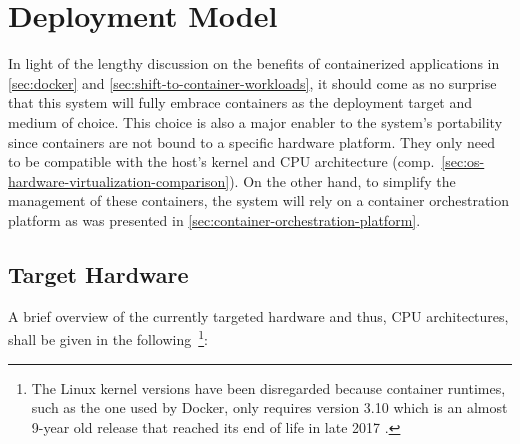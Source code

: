 \section{Deployment Model}
\label{sec:deployment-model}

In light of the lengthy discussion on the benefits of containerized applications in \autoref{sec:docker} and \autoref{sec:shift-to-container-workloads}, it should come as no surprise that this system will fully embrace containers as the deployment target and medium of choice. This choice is also a major enabler to the system's portability since containers are not bound to a specific hardware platform. They only need to be compatible with the host's kernel and \acs{CPU} architecture (comp.~\autoref{sec:os-hardware-virtualization-comparison}). On the other hand, to simplify the management of these containers, the system will rely on a container orchestration platform as was presented in \autoref{sec:container-orchestration-platform}.

\newpage

\subsection{Target Hardware}
\label{sec:deployment-target-hardware}

A brief overview of the currently targeted hardware and thus, \acs{CPU} architectures, shall be given in the following~\footnote{The Linux kernel versions have been disregarded because container runtimes, such as the one used by Docker, only requires version 3.10 which is an almost 9-year old release that reached its end of life in late 2017 \cite{dockerEngine} \cite{lkml2018eol}.}:

